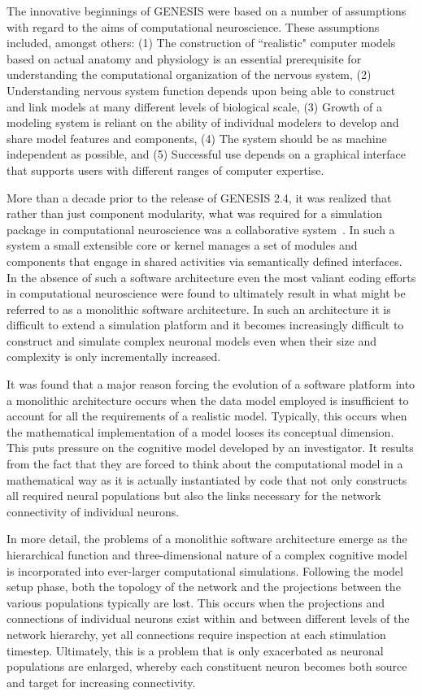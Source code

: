 \documentclass[11pt,3p,twocolumn]{JMN}
\begin{document}
The innovative beginnings of GENESIS were based on a number of assumptions with regard to the aims of computational neuroscience. These assumptions included, amongst others: (1) The construction of ``realistic" computer models based on actual anatomy and physiology is an essential prerequisite for understanding the computational organization of the nervous system, (2) Understanding nervous system function depends upon being able to construct and link models at many different levels of biological scale, (3) Growth of a modeling system is reliant on the ability of individual modelers to develop and share model features and components, (4) The system should be as machine independent as possible, and (5) Successful use depends on a graphical interface that supports users with different ranges of computer expertise.

More than a decade prior to the release of GENESIS 2.4, it was realized that rather than just component modularity, what was required for a simulation package in computational neuroscience was a collaborative system~\citep{cornelis03}. In such a system a small extensible core or kernel manages a set of modules and components that engage in shared activities via semantically defined interfaces. In the absence of such a software architecture even the most valiant coding efforts in computational neuroscience were found to ultimately result in what might be referred to as a monolithic software architecture. In such an architecture it is difficult to extend a simulation platform and it becomes increasingly difficult to construct and simulate complex neuronal models even when their size and complexity is only incrementally increased.

It was found that a major reason forcing the evolution of a software platform into a monolithic architecture occurs when the data model employed is insufficient to account for all the requirements of a realistic model. Typically, this occurs when the mathematical implementation of a model looses its conceptual dimension. This puts pressure on the cognitive model developed by an investigator. It results from the fact that they are forced to think about the computational model in a mathematical way as it is actually instantiated by code that not only constructs all required neural populations but also the links necessary for the network connectivity of individual neurons.

In more detail, the problems of a monolithic software architecture emerge as the hierarchical function and three-dimensional nature of a complex cognitive model is incorporated into ever-larger computational simulations. Following the model setup phase, both the topology of the network and the projections between the various populations typically are lost. This occurs when the projections and connections of individual neurons exist within and between different levels of the network hierarchy, yet all connections require inspection at each stimulation timestep. Ultimately, this is a problem that is only exacerbated as neuronal populations are enlarged, whereby each constituent neuron becomes both source and target for increasing connectivity.
\end{document}
